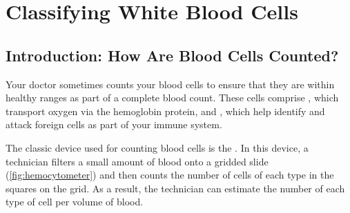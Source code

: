 \chapter[Classifying White Blood Cells]{Classifying White Blood Cells}
\label{chapter:white_blood_cells}
\renewcommand{\chaptertitle}{Classifying White Blood Cells}


\FloatBarrier

\section{Introduction: How Are Blood Cells Counted?}
\label{sec:introduction}

Your doctor sometimes counts your blood cells to ensure that they are within healthy ranges as part of a complete blood count. These cells comprise , which transport oxygen via the hemoglobin protein, and , which help identify and attack foreign cells as part of your immune system.

The classic device used for counting blood cells is the . In this device, a technician filters a small amount of blood onto a gridded slide (\autoref{fig:hemocytometer}) and then counts the number of cells of each type in the squares on the grid. As a result, the technician can estimate the number of each type of cell per volume of blood.\\

